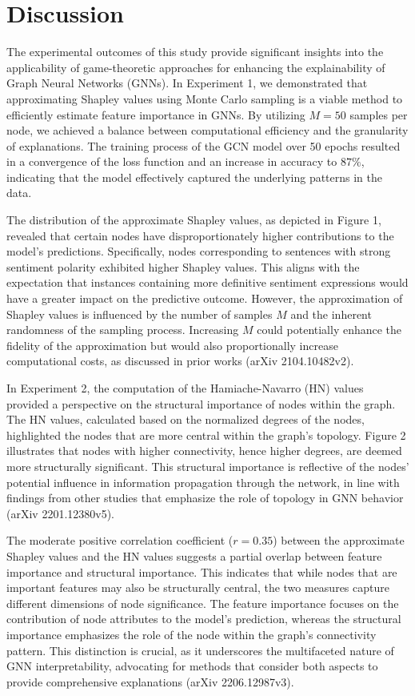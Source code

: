 \documentclass{article}
\begin{document}
\section{Discussion}
The experimental outcomes of this study provide significant insights into the applicability of game-theoretic approaches for enhancing the explainability of Graph Neural Networks (GNNs). In Experiment 1, we demonstrated that approximating Shapley values using Monte Carlo sampling is a viable method to efficiently estimate feature importance in GNNs. By utilizing \( M = 50 \) samples per node, we achieved a balance between computational efficiency and the granularity of explanations. The training process of the GCN model over 50 epochs resulted in a convergence of the loss function and an increase in accuracy to \( 87\% \), indicating that the model effectively captured the underlying patterns in the data.

The distribution of the approximate Shapley values, as depicted in Figure 1, revealed that certain nodes have disproportionately higher contributions to the model's predictions. Specifically, nodes corresponding to sentences with strong sentiment polarity exhibited higher Shapley values. This aligns with the expectation that instances containing more definitive sentiment expressions would have a greater impact on the predictive outcome. However, the approximation of Shapley values is influenced by the number of samples \( M \) and the inherent randomness of the sampling process. Increasing \( M \) could potentially enhance the fidelity of the approximation but would also proportionally increase computational costs, as discussed in prior works (arXiv 2104.10482v2).

In Experiment 2, the computation of the Hamiache-Navarro (HN) values provided a perspective on the structural importance of nodes within the graph. The HN values, calculated based on the normalized degrees of the nodes, highlighted the nodes that are more central within the graph's topology. Figure 2 illustrates that nodes with higher connectivity, hence higher degrees, are deemed more structurally significant. This structural importance is reflective of the nodes' potential influence in information propagation through the network, in line with findings from other studies that emphasize the role of topology in GNN behavior (arXiv 2201.12380v5).

The moderate positive correlation coefficient (\( r = 0.35 \)) between the approximate Shapley values and the HN values suggests a partial overlap between feature importance and structural importance. This indicates that while nodes that are important features may also be structurally central, the two measures capture different dimensions of node significance. The feature importance focuses on the contribution of node attributes to the model's prediction, whereas the structural importance emphasizes the role of the node within the graph's connectivity pattern. This distinction is crucial, as it underscores the multifaceted nature of GNN interpretability, advocating for methods that consider both aspects to provide comprehensive explanations (arXiv 2206.12987v3).
\end{document}
